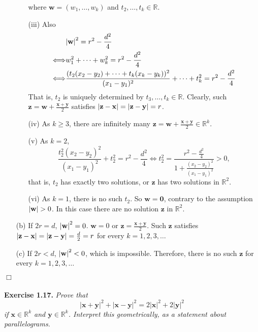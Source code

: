 \documentclass{article}
\begin{document}
\begin{enumerate}
\begin{enumerate}
where $\mathbf{w} = (w_1, \ldots, w_k)$ and
$t_2, \ldots, t_k \in \mathbb{R}$.
\item[(iii)]
Also
\begin{align*}
&\abs{\mathbf{w}}^2 = r^2 - \frac{d^2}{4} \\
\Longleftrightarrow&
w_1^2 + \cdots + w_k^2 = r^2 - \frac{d^2}{4} \\
\Longleftrightarrow&
\frac{(t_2(x_2-y_2) + \cdots + t_{k}(x_{k}-y_{k}))^2}{(x_1-y_1)^2}
+ \cdots + t_k^2 = r^2 - \frac{d^2}{4}
\end{align*}
That is, $t_2$ is uniquely determined by $t_3, \ldots, t_k \in \mathbb{R}$.
Clearly, such $\mathbf{z} = \mathbf{w} + \frac{\mathbf{x} + \mathbf{y}}{2}$
satisfies $\abs{\mathbf{z} - \mathbf{x}} = \abs{\mathbf{z} - \mathbf{y}} = r$.
\item[(iv)]
As $k \geq 3$, there are infinitely many
$\mathbf{z} = \mathbf{w} + \frac{\mathbf{x} + \mathbf{y}}{2} \in \mathbb{R}^k$.
\item[(v)]
As $k = 2$,
$$\frac{t_2^2 (x_2-y_2)^2}{(x_1-y_1)^2} + t_2^2 = r^2 - \frac{d^2}{4}
\Longleftrightarrow
t_2^2 = \frac{r^2 - \frac{d^2}{4}}{1 + \frac{(x_2-y_2)^2}{(x_1-y_1)^2}} > 0,$$
that is, $t_2$ has exactly two solutions,
or $\mathbf{z}$ has two solutions in $\mathbb{R}^2$.
\item[(vi)]
As $k = 1$, there is no such $t_2$. So $\mathbf{w} = \mathbf{0}$,
contrary to the assumption $\abs{\mathbf{w}} > 0$.
In this case there are no solution $\mathbf{z}$ in $\mathbb{R}^2$.
\end{enumerate}
\item[(b)]
If $2r = d$, $\abs{\mathbf{w}}^2 = 0$.
$\mathbf{w} = 0$ or $\mathbf{z} = \frac{\mathbf{x}+\mathbf{y}}{2}$.
Such $\mathbf{z}$ satisfies
$\abs{\mathbf{z} - \mathbf{x}} = \abs{\mathbf{z} - \mathbf{y}} = \frac{d}{2} = r$
for every $k = 1, 2, 3, \ldots$
\item[(c)]
If $2r < d$, $\abs{\mathbf{w}}^2 < 0$,
which is impossible.
Therefore, there is no such $\mathbf{z}$
for every $k = 1, 2, 3, \ldots$
\end{enumerate}
$\Box$ \\\\






\textbf{Exercise 1.17.}
\emph{Prove that
$$|\mathbf{x}+\mathbf{y}|^2 + |\mathbf{x}-\mathbf{y}|^2
= 2|\mathbf{x}|^2 + 2|\mathbf{y}|^2$$
if $\mathbf{x} \in \mathbb{R}^k$ and $\mathbf{y} \in \mathbb{R}^k$.
Interpret this geometrically,
as a statement about parallelograms.} \\
\end{document}
